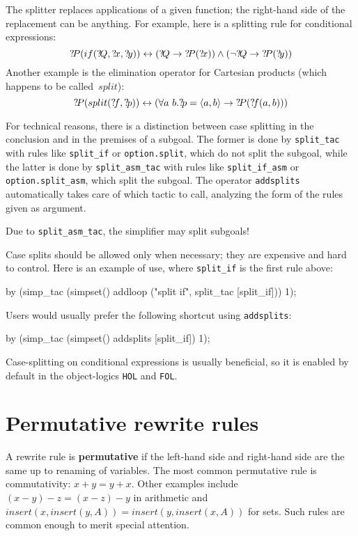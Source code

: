 The splitter replaces applications of a given function; the right-hand side
of the replacement can be anything.  For example, here is a splitting rule
for conditional expressions:
\[ \Var{P}(if(\Var{Q},\Var{x},\Var{y})) \bimp (\Var{Q} \imp \Var{P}(\Var{x}))
\conj (\neg\Var{Q} \imp \Var{P}(\Var{y})) 
\] 
Another example is the elimination operator for Cartesian products (which
happens to be called~$split$):  
\[ {?\!P}(split({?\!f},{?\!p})) \leftrightarrow (\forall a~b. {?\!p} =
\langle a,b\rangle \rightarrow {?\!P}({?\!f}(a,b))) 
\] 

For technical reasons, there is a distinction between case splitting in the 
conclusion and in the premises of a subgoal. The former is done by
\texttt{split_tac} with rules like \texttt{split_if} or \texttt{option.split}, 
which do not split the subgoal, while the latter is done by 
\texttt{split_asm_tac} with rules like \texttt{split_if_asm} or 
\texttt{option.split_asm}, which split the subgoal.
The operator \texttt{addsplits} automatically takes care of which tactic to
call, analyzing the form of the rules given as argument.
\begin{warn}
Due to \texttt{split_asm_tac}, the simplifier may split subgoals!
\end{warn}

Case splits should be allowed only when necessary; they are expensive
and hard to control.  Here is an example of use, where \texttt{split_if}
is the first rule above:
\begin{ttbox}
by (simp_tac (simpset() 
                 addloop ("split if", split_tac [split_if])) 1);
\end{ttbox}
Users would usually prefer the following shortcut using \texttt{addsplits}:
\begin{ttbox}
by (simp_tac (simpset() addsplits [split_if]) 1);
\end{ttbox}
Case-splitting on conditional expressions is usually beneficial, so it is
enabled by default in the object-logics \texttt{HOL} and \texttt{FOL}.


\section{Permutative rewrite rules}

A rewrite rule is {\bf permutative} if the left-hand side and right-hand
side are the same up to renaming of variables.  The most common permutative
rule is commutativity: $x+y = y+x$.  Other examples include $(x-y)-z =
(x-z)-y$ in arithmetic and $insert(x,insert(y,A)) = insert(y,insert(x,A))$
for sets.  Such rules are common enough to merit special attention.

